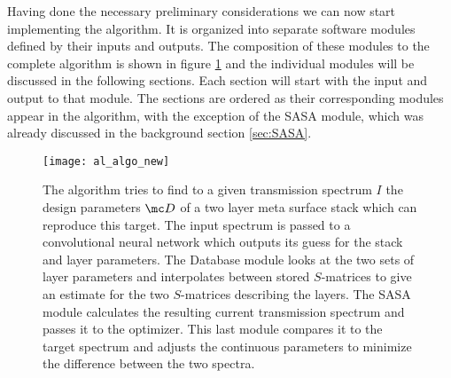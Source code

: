 Having done the necessary preliminary considerations we can now start implementing the algorithm. It is organized into separate software modules defined by their inputs and outputs. The composition of these modules to the complete algorithm is shown in figure \ref{fig:al:algo} and the individual modules will be discussed in the following sections. Each section will start with the input and output to that module. The sections are ordered as their corresponding modules appear in the algorithm, with the exception of the SASA module, which was already discussed in the background section \ref{sec:SASA}.

\begin{figure}[H]
    \centering
    \texttt{[image: al\_algo\_new]}
    \caption[]{The algorithm tries to find to a given transmission spectrum $I$ the design parameters $\mc D$ of a two layer meta surface stack which can reproduce this target. The input spectrum is passed to a convolutional neural network which outputs its guess for the stack and layer parameters. The Database module looks at the two sets of layer parameters and interpolates between stored $S$-matrices to give an estimate for the two $S$-matrices describing the layers. The SASA module calculates the resulting current transmission spectrum and passes it to the optimizer. This last module compares it to the target spectrum and adjusts the continuous parameters to minimize the difference between the two spectra.}
    \label{fig:al:algo}
\end{figure}
\vspace{0.35cm}


